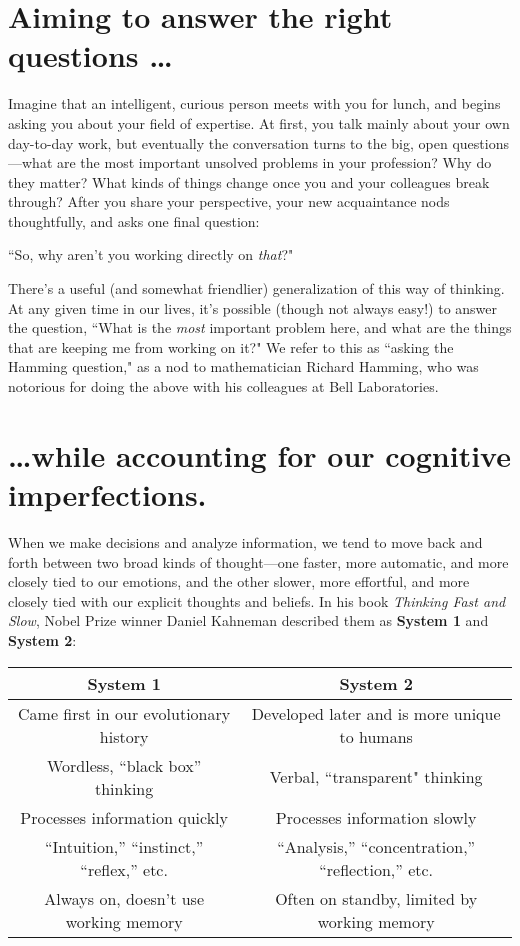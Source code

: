 	\section*{Aiming to answer the right questions \ldots}
	Imagine that an intelligent, curious person meets with you for lunch, and begins asking you about your field of expertise.  At first, you talk mainly about your own day-to-day work, but eventually the conversation turns to the big, open questions---what are the most important unsolved problems in your profession?  Why do they matter?  What kinds of things change once you and your colleagues break through?  After you share your perspective, your new acquaintance nods thoughtfully, and asks one final question:
	
	``So, why aren't you working directly on \emph{that}?"
	
	There's a useful (and somewhat friendlier) generalization of this way of thinking.  At any given time in our lives, it's possible (though not always easy!) to answer the question, ``What is the \emph{most} important problem here, and what are the things that are keeping me from working on it?"  We refer to this as ``asking the Hamming question," as a nod to mathematician Richard Hamming, who was notorious for doing the above with his colleagues at Bell Laboratories.
	
	\section*{\ldots while accounting for our cognitive imperfections.}
	When we make decisions and analyze information, we tend to move back and forth between two broad kinds of thought---one faster, more automatic, and more closely tied to our emotions, and the other slower, more effortful, and more closely tied with our explicit thoughts and beliefs.  In his book \emph{Thinking Fast and Slow}, Nobel Prize winner Daniel Kahneman described them as \textbf{System 1} and  \textbf{System 2}:
	
	\renewcommand{\arraystretch}{1.2}
	\begin{center}
	\begin{tabular}{ |c|c| }
	\hline
	\textbf{System 1} &  \textbf{System 2} \\
	\hline \hline
	 Came first in our evolutionary history & Developed later and is more unique to humans \\
	 Wordless, ``black box'' thinking & Verbal, ``transparent" thinking \\
	 Processes information quickly & Processes information slowly \\
	 ``Intuition,'' ``instinct,'' ``reflex,'' etc. & ``Analysis,'' ``concentration,'' ``reflection,'' etc. \\
	 Always on, doesn't use working memory & Often on standby, limited by working memory \\
	 \hline
	 \end{tabular}
	 \end{center}
	 
